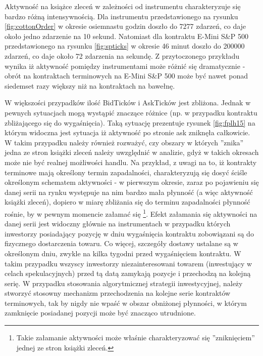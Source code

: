 \documentclass[a4paper,12pt,openany, DIV=calc, headsepline]{scrbook}
\begin{document}
Aktywność na książce zleceń w zależności od instrumentu charakteryzuje się bardzo różną intensywnością. Dla instrumentu przedstawionego na rysunku \ref{fig:cottonOrder} w okresie osiemnastu godzin doszło do 7277 zdarzeń, co daje około jedno zdarzenie na 10 sekund. Natomiast dla kontraktu E-Mini S\&P 500 przedstawionego na rysunku \ref{fig:spticks} w okresie 46 minut doszło do 200000 zdarzeń, co daje około 72 zdarzenia na sekundę. Z przytoczonego przykładu wynika iż aktywność pomiędzy instrumentami może różnić się dramatycznie - obrót na kontraktach terminowych na E-Mini S\&P 500 może być nawet ponad siedemset razy większy niż na kontraktach na bawełnę.


W większości przypadków ilość BidTicków i AskTicków jest zbliżona. Jednak w pewnych sytuacjach mogą wystąpić znaczące różnice (np. w przypadku kontraktu zbliżającego się do wygaśnięcia). Taką sytuację prezentuje rysunek \ref{fig:fplh15} na którym widoczna jest sytuacja iż aktywność po stronie ask zniknęła całkowicie. W takim przypadku należy również rozważyć, czy obszary w których ''znika'' jedna ze stron książki zleceń należy uwzględnić w analizie, gdyż w takich okresach może nie być realnej możliwości handlu.  Na przykład, z uwagi na to, iż kontrakty terminowe mają określony termin zapadalności, charakteryzują się dosyć ściśle określonym schematem aktywności - w pierwszym okresie, zaraz po pojawieniu się danej serii na rynku występuje na nim bardzo mała płynność (a więc aktywność książki zleceń), dopiero w miarę zbliżania się do terminu zapadalności płynność rośnie, by w pewnym momencie załamać się \footnote{Takie załamanie aktywności może właśnie charakteryzować się ''zniknięciem'' jednej ze stron książki zleceń.}.
Efekt załamania się aktywności na danej serii jest widoczny głównie na instrumentach w przypadku których inwestorzy posiadający pozycję w dniu wygaśnięcia kontraktu zobowiązani są do fizycznego dostarczenia towaru. Co więcej, szczegóły dostawy ustalane są w określonym dniu, zwykle na kilka tygodni przed wygaśnięciem kontraktu. W takim przypadku wszyscy inwestorzy niezainteresowani towarem (inwestujący w celach spekulacyjnych) przed tą datą zamykają pozycje i przechodzą na kolejną serię. W przypadku stosowania algorytmicznej strategii inwestycyjnej, należy stworzyć stosowny mechanizm przechodzenia na kolejne serie kontraktów terminowych, tak by nigdy nie wpaść w obszar obniżonej płynności, w którym zamknięcie posiadanej pozycji może być znacząco utrudnione.
\end{document}
